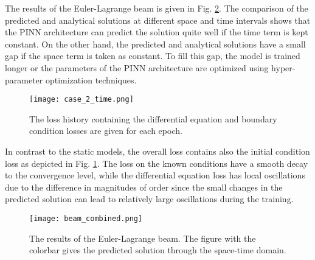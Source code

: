 The results of the Euler-Lagrange beam is given in Fig. \ref{fig:beam_time_res}. The comparison of the predicted 
and analytical solutions at different space and time intervals shows that the PINN architecture can predict the solution quite well
if the time term is kept constant. On the other hand, the predicted and analytical solutions have a small gap if the space term
is taken as constant. To fill this gap, the model is trained longer or the parameters of the PINN architecture are optimized using
hyper-parameter optimization techniques.


\begin{figure}[ht]
    \centering
    \texttt{[image: case\_2\_time.png]}  
    \caption{The loss history containing
    the differential equation and boundary condition losses are given for each epoch.}
    \label{fig:beam_time_loss}
\end{figure}

In contrast to the static models, the overall loss contains also the initial condition loss as depicted in Fig. \ref{fig:beam_time_loss}. 
The loss on the known conditions have a smooth decay to the convergence level, while the differential equation loss has local oscillations
due to the difference in magnitudes of order since the small changes in the predicted solution can lead to relatively large
oscillations during the training.  

\begin{figure}[b]
    \centering
    \texttt{[image: beam\_combined.png]}
    \caption{The results of the Euler-Lagrange beam. The figure with the colorbar gives the predicted solution through the space-time domain.}
    \label{fig:beam_time_res}
\end{figure}


